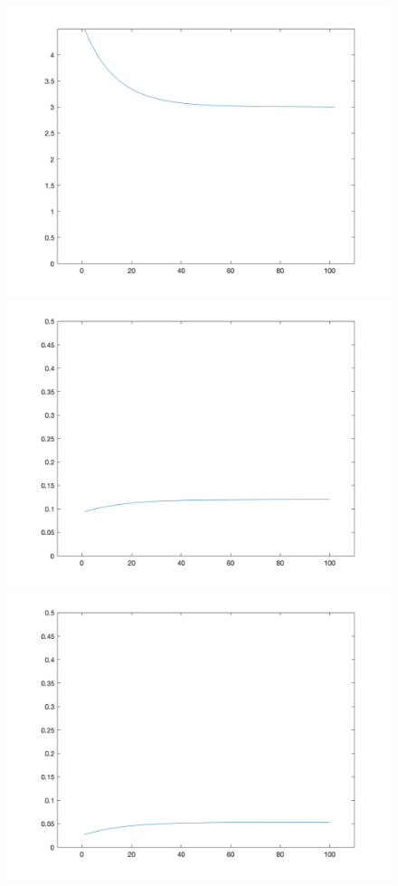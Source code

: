\documentclass[10pt,letter]{article}
\begin{document}
\begin{figure}
\includegraphics[scale=0.2]{ps2q3_4k2}
\includegraphics[scale=0.2]{ps2q3_4r_k2}
\includegraphics[scale=0.2]{ps2q3_4r_b2}

\end{figure}
\end{document}
